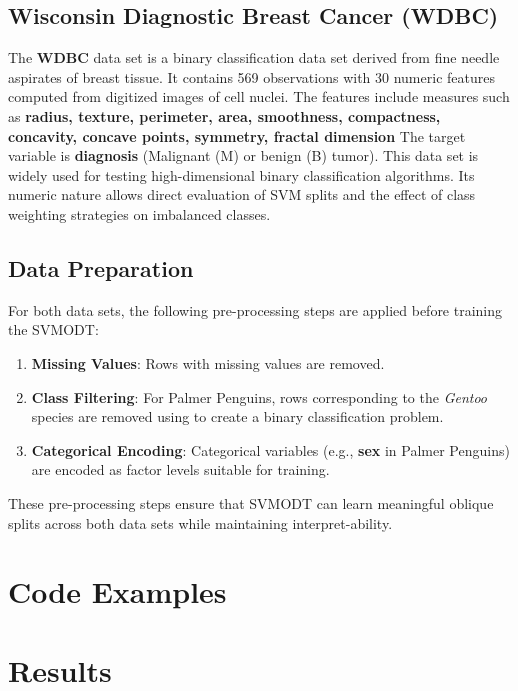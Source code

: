 \subsection{Wisconsin Diagnostic Breast Cancer (WDBC)}\label{wisconsin-diagnostic-breast-cancer-wdbc}

The \textbf{WDBC} \citep{Street1993} data set is a binary classification data set derived from fine needle aspirates of breast tissue. It contains 569 observations with 30 numeric features computed from digitized images of cell nuclei. The features include measures such as \textbf{radius, texture, perimeter, area, smoothness, compactness, concavity, concave points, symmetry, fractal dimension} The target variable is \textbf{diagnosis} (Malignant (M) or benign (B) tumor). This data set is widely used for testing high-dimensional binary classification algorithms. Its numeric nature allows direct evaluation of SVM splits and the effect of class weighting strategies on imbalanced classes.

\subsection{Data Preparation}\label{data-preparation}

For both data sets, the following pre-processing steps are applied before training the SVMODT:

\begin{enumerate}
\def\labelenumi{\arabic{enumi}.}
\tightlist
\item
  \textbf{Missing Values}: Rows with missing values are removed.
\item
  \textbf{Class Filtering}: For Palmer Penguins, rows corresponding to the \emph{Gentoo} species are removed using  to create a binary classification problem.
\item
  \textbf{Categorical Encoding}: Categorical variables (e.g., \textbf{sex} in Palmer Penguins) are encoded as factor levels suitable for training.
\end{enumerate}

These pre-processing steps ensure that SVMODT can learn meaningful oblique splits across both data sets while maintaining interpret-ability.

\section{Code Examples}\label{code-examples}

\section{Results}\label{results}

